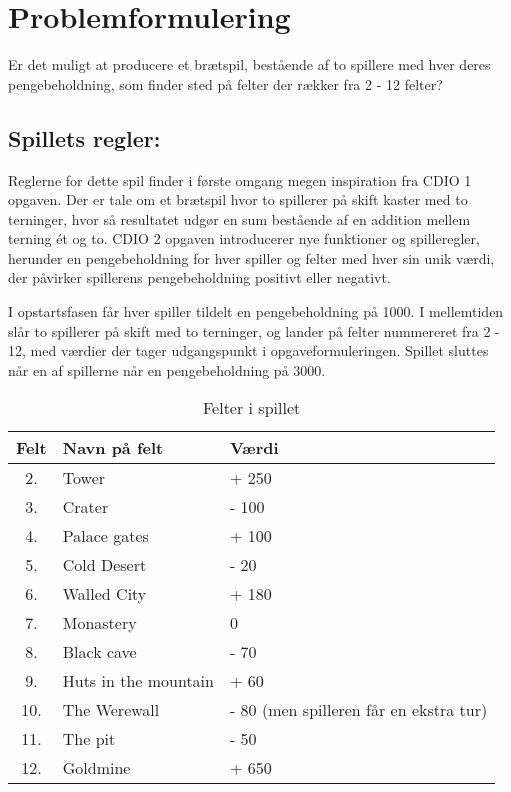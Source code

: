 \chapter{Problemformulering}
Er det muligt at producere et brætspil, bestående af to spillere med hver deres pengebeholdning, som finder sted på felter der rækker fra 2 - 12 felter?

\section*{Spillets regler:}
\label{Sec:rules}
Reglerne for dette spil finder i første omgang megen inspiration fra CDIO 1 opgaven.
Der er tale om et brætspil hvor to spillerer på skift kaster med to terninger, hvor så resultatet udgør en sum bestående af en addition mellem terning ét og to.
CDIO 2 opgaven introducerer nye funktioner og spilleregler, herunder en pengebeholdning for hver spiller og felter med hver sin unik værdi, der påvirker spillerens pengebeholdning positivt eller negativt.

\vspace{5mm}

\noindent I opstartsfasen får hver spiller tildelt en pengebeholdning på 1000.
I mellemtiden slår to spillerer på skift med to terninger, og lander på felter nummereret fra 2 - 12, med værdier der tager udgangspunkt i opgaveformuleringen.
Spillet sluttes når en af spillerne når en pengebeholdning på 3000.

\vspace{5mm}
\begin{table}[H]
    \begin{center}
        \begin{tabular}{ | c | l | p{7cm}|}
            \hline
            \textbf{Felt} & \textbf{Navn på felt} & \textbf{Værdi} \\ \hline
            2.  &   Tower                   & + 250 \\ \hline
            3.  &   Crater                  & - 100 \\ \hline
            4.  &   Palace gates            & + 100 \\ \hline
            5.  &   Cold Desert             & - 20 \\ \hline
            6.  &   Walled City             & + 180 \\ \hline
            7.  &   Monastery               & 0 \\ \hline
            8.  &   Black cave              & - 70 \\ \hline
            9.  &   Huts in the mountain    & + 60 \\ \hline
            10. &   The Werewall            & - 80 
            (men spilleren får en ekstra tur) \\ \hline
            11. &   The pit                 & - 50 \\ \hline
            12. &   Goldmine                & + 650 \\ \hline
            \hline
        \end{tabular}
    \end{center}
    \caption{Felter i spillet}
    \label{table:fields}
\end{table}